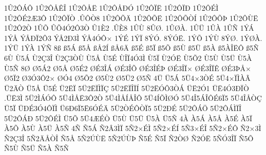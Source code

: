 {1^^db2^^d4^^c1^^d4
1^^db2^^d4^^c5^^ca^^ce
1^^db2^^d4^^c5^^cb
1^^db2^^d4^^c5^^d0^^d3
1^^db2^^d4^^cf^^cb
1^^db2^^d4^^cf^^d0
1^^db2^^d4^^c9^^cc
1^^db2^^d4^^c92^^c63^^d4
1^^db2^^d4^^cf^^d2
.^^db^^d4^^d28
1^^db2^^d4^^d5^^c4
1^^db2^^d4^^d5^^cb
1^^db2^^d4^^d5^^d2^^cd
1^^db2^^d4^^d5^^de
1^^db2^^d4^^d9^^cb
1^^db2^^d42^^d2
1^^db^^d5
^^db^^d54^^d32^^d43^^d2
^^db1^^c82
.^^db^^c88
1^^db^^d9
8^^db^^d8.
1^^db^^d8^^c0.
1^^db^^dc
1^^db^^c0
1^^db^^d1
1^^dd^^c1
1^^dd^^c5
^^dd^^c5^^d0^^cf2^^d43
^^dd^^c52^^d03^^cc
^^dd^^c54^^d3^^d4^^d7
1^^dd^^c9
1^^dd^^cf
8^^dd^^d3.
8^^dd^^d3^^cb.
1^^dd^^d5
1^^dd^^d9
8^^dd^^d8.
1^^dd^^d8^^c0.
1^^dd^^dc
1^^dd^^c0
1^^dd^^d1
8^^df
^^df5^^c1
^^df5^^c5
^^df^^c52^^cd
^^df^^c56^^c4
^^df5^^c9
^^df5^^cf
^^df5^^d5
^^df5^^d9
^^df5^^dc
^^df5^^c0
^^df5^^c0^^ce^^cb^^d4
^^df5^^d1
6^^d9
^^d95^^c1
^^d92^^c73^^ce
^^d92^^c73^^d2^^d9
^^d95^^c5
^^d95^^c9
^^d9^^ce^^cf4^^d33^^cc
^^d95^^cf
^^d92^^d3^^cb
^^d95^^d52
^^d95^^d9
^^d95^^dc
^^d95^^c0
^^d95^^d1
8^^d8
^^d85^^c12
^^d85^^c5
^^d85^^c92
^^d8^^c93^^ce^^c1
^^d8^^c93^^ce^^d5
^^d8^^c93^^ce^^c9^^de
^^d8^^c93^^ce^^cf^^d7
^^d8^^c93^^ce^^cf^^ca
^^d8^^c93^^de^^c5^^d7
^^d85^^cf2
^^d83^^d33^^d42^^d7
^^d8^^d34
^^d85^^d52
^^d85^^d92
^^d85^^dc2
^^d85^^d1
4^^dc
^^dc5^^c1
5^^dc4^^d73^^d2^^c9
5^^dc4^^d7^^cf^^cc^^c0^^c3
^^dc2^^c4^^d2
^^dc5^^c5
^^dc5^^c9
^^dc2^^cb^^cf
5^^dc2^^cb^^cf^^cc^^cf^^c7
5^^dc2^^cb^^cf^^ce^^cf^^cd
5^^dc2^^cb^^d3^^d43^^d2^^c1
^^dc^^cb2^^d31
^^dc^^cb4^^d33^^d0^^cf^^d2
.^^dc^^cb3^^cc
5^^dc2^^cc^^c1^^d3^^d4
5^^dc4^^cc^^c5^^cb3^^d42^^d2
5^^dc4^^cc^^c5^^cd^^c5^^ce^^d4
5^^dc4^^cd^^d5^^cc^^d8^^d3
5^^dc4^^ce5^^c1^^ce^^d4^^c96^^cf5
5^^dc4^^ce^^c5^^d2^^c7
^^dc5^^cf
^^dc^^d0^^c93^^d34^^d4^^cf^^cc
^^dc6^^d06^^cf5^^cb6^^d3^^c9^^c4
5^^dc2^^d2^^c9^^d4^^d2^^cf5
5^^dc2^^d0^^c9
5^^dc2^^d4^^c1^^d6
5^^dc2^^d4^^c1^^cc^^cf^^ce
5^^dc2^^d4^^c1^^d0
5^^dc2^^d4^^c9^^cc
^^dc5^^d5
5^^dc4^^c6^^c9^^d2
^^dc5^^d9
^^dc5^^dc
^^dc5^^c0
^^dc5^^d1
4^^c0
^^c05^^c1
^^c05^^c5
^^c05^^c9
^^c05^^cf
^^c05^^d5
^^c05^^d9
^^c05^^dc
^^c05^^d1
4^^d1
^^d15^^c1
^^d12^^c23^^cc^^cf
5^^d12^^d7^^c9^^cc
5^^d12^^d7^^c9^^cd
5^^d13^^d7^^c9^^ce
5^^d12^^d7^^c9^^d4
^^d12^^d73^^cc
^^d12^^c73^^ce
5^^d12^^c4^^c5^^d2^^ce
^^d15^^c5
5^^d12^^da^^d9^^cb
5^^d12^^da^^d9^^de
^^d15^^c9
^^d15^^cf
^^d12^^d2^^d8
^^d12^^d3^^cb
5^^d1^^d33^^ce^^cf
^^d15^^d5
^^d15^^d9
^^d15^^dc
^^d15^^c0
^^d15^^d1
}
